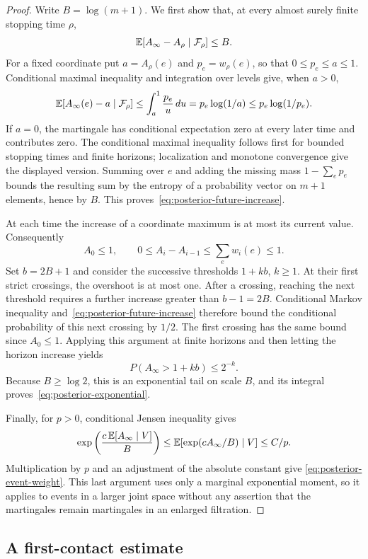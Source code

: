 \begin{proof}
Write $B=\log(m+1)$.  We first show that, at every almost surely finite
stopping time $\rho$,
\begin{equation}\label{eq:posterior-future-increase}
 \mathbb E[A_\infty-A_\rho\mid\mathcal F_\rho]\le B.
\end{equation}
For a fixed coordinate put $a=A_\rho(e)$ and $p_e=w_\rho(e)$, so that
$0\le p_e\le a\le1$.  Conditional maximal inequality and integration over
levels give, when $a>0$,
\[
 \mathbb E[A_\infty(e)-a\mid\mathcal F_\rho]
 \le\int_a^1\frac{p_e}{u}\,du
 =p_e\log(1/a)\le p_e\log(1/p_e).
\]
If $a=0$, the martingale has conditional expectation zero at every later
time and contributes zero.  The conditional maximal inequality follows
first for bounded stopping times and finite horizons; localization and
monotone convergence give the displayed version.  Summing over $e$ and
adding the missing mass $1-\sum_e p_e$ bounds the resulting sum by the
entropy of a probability vector on $m+1$ elements, hence by $B$.  This
proves~\eqref{eq:posterior-future-increase}.

At each time the increase of a coordinate maximum is at most its current
value.  Consequently
\[
 A_0\le1,\qquad 0\le A_i-A_{i-1}\le\sum_e w_i(e)\le1.
\]
Set $b=2B+1$ and consider the successive thresholds $1+kb$, $k\ge1$.
At their first strict crossings, the overshoot is at most one.  After a
crossing, reaching the next threshold requires a further increase greater
than $b-1=2B$.  Conditional Markov inequality
and~\eqref{eq:posterior-future-increase} therefore bound the conditional
probability of this next crossing by $1/2$.  The first crossing has the
same bound since $A_0\le1$.  Applying this argument at finite horizons
and then letting the horizon increase yields
\[
 P(A_\infty>1+kb)\le2^{-k}.
\]
Because $B\ge\log2$, this is an exponential tail on scale $B$, and its
integral proves~\eqref{eq:posterior-exponential}.

Finally, for $p>0$, conditional Jensen inequality gives
\[
 \exp\left(\frac{c\,\mathbb E[A_\infty\mid V]}{B}\right)
 \le \mathbb E[\exp(cA_\infty/B)\mid V]\le C/p.
\]
Multiplication by $p$ and an adjustment of the absolute constant give
\eqref{eq:posterior-event-weight}.  This last argument uses only a
marginal exponential moment, so it applies to events in a larger joint
space without any assertion that the martingales remain martingales in
an enlarged filtration.
\end{proof}

\subsection{A first-contact estimate}

